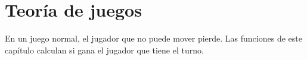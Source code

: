 \section{Teoría de juegos}\label{sec:juegos}

En un juego normal, el jugador que no puede mover pierde. Las funciones de
este capítulo calculan si gana el jugador que tiene el turno.




